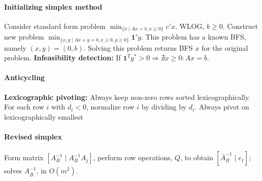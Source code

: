 \documentclass{article}
\begin{document}
\paragraph{Initializing simplex method} Consider standard form problem $\min_{\{x \mid Ax = b, x \geq 0\}} c'x$. WLOG, $b\geq 0$. Construct new problem $\min_{\{x, y \mid Ax + y = b, x\geq 0, y \geq 0\}} \mathbf{1}'y$. This problem has a known BFS, namely $(x, y) = (0, b)$. Solving this problem returns BFS $x$ for the original problem. \textbf{Infeasibility detection:} If $\mathbf{1}^Ty^* > 0 \Longrightarrow \nexists x \geq 0 : Ax = b$.


\paragraph{Anticycling} \textbf{Lexicographic pivoting:} Always keep non-zero rows sorted lexicographically. For each row $i$ with $d_i < 0$, normalize row $i$ by dividing by $d_i$. Always pivot on lexicographically smallest

\paragraph{Revised simplex} Form matrix $[A_B^{-1} \mid A_B^{-1}A_j]$, perform row operations, $Q$, to obtain $[\bar A_B^{-1} \mid e_\ell]$; solves $A_{\bar B}^{-1}$, in $O(m^2)$.
\end{document}
